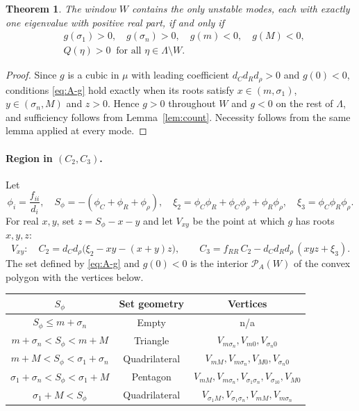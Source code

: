 \documentclass[11pt]{article}
\newtheorem{theorem}{Theorem}
\theoremstyle{definition}
\theoremstyle{remark}
\begin{document}
\begin{theorem}\label{thm:A}
The window $W$ contains the only unstable modes, each with exactly one eigenvalue with positive real part, if and only if
\begin{align}
&g(\sigma_1)>0,\quad g(\sigma_n)>0,\quad g(m)<0,\quad g(M)<0, \label{eq:A-g}\\
&Q(\eta)>0\ \text{ for all }\eta\in\Lambda\setminus W. \label{eq:A-Q}
\end{align}
\end{theorem}

\begin{proof}
Since $g$ is a cubic in $\mu$ with leading coefficient $d_Cd_Rd_\rho>0$ and $g(0)<0$, conditions \eqref{eq:A-g} hold exactly when its roots satisfy $x\in(m,\sigma_1)$, $y\in(\sigma_n,M)$ and $z>0$. Hence $g>0$ throughout $W$ and $g<0$ on the rest of $\Lambda$, and sufficiency follows from Lemma~\ref{lem:count}. Necessity follows from the same lemma applied at every mode.
\end{proof}

\paragraph{Region in $(C_2,C_3)$.} Let
\[
\phi_i=\frac{f_{ii}}{d_i},\quad S_\phi=-(\phi_C+\phi_R+\phi_\rho),\quad
\xi_2=\phi_C\phi_R+\phi_C\phi_\rho+\phi_R\phi_\rho,\quad \xi_3=\phi_C\phi_R\phi_\rho.
\]
For real $x,y$, set $z=S_\phi-x-y$ and let $V_{xy}$ be the point at which $g$ has roots $x,y,z$:
\[
V_{xy}:\quad
C_2=d_Cd_\rho\bigl(\xi_2-xy-(x+y)z\bigr),\qquad
C_3=f_{RR}\,C_2-d_Cd_Rd_\rho\,(xyz+\xi_3).
\]
The set defined by \eqref{eq:A-g} and $g(0)<0$ is the interior $\mathcal{P}_A(W)$ of the convex polygon with the vertices below.

\begin{center}
\renewcommand{\arraystretch}{1.25}
\begin{tabular}{|c|c|c|}
\hline
$S_\phi$ & Set geometry & Vertices \\
\hline
$S_\phi\le m+\sigma_n$ & Empty & n/a \\
\hline
$m+\sigma_n<S_\phi<m+M$ & Triangle & $V_{m\sigma_n},V_{m0},V_{\sigma_n0}$ \\
\hline
$m+M<S_\phi<\sigma_1+\sigma_n$ & Quadrilateral & $V_{mM},V_{m\sigma_n},V_{M0},V_{\sigma_n0}$ \\
\hline
$\sigma_1+\sigma_n<S_\phi<\sigma_1+M$ & Pentagon & $V_{mM},V_{m\sigma_n},V_{\sigma_1\sigma_n},V_{\sigma_10},V_{M0}$ \\
\hline
$\sigma_1+M<S_\phi$ & Quadrilateral & $V_{\sigma_1M},V_{\sigma_1\sigma_n},V_{mM},V_{m\sigma_n}$ \\
\hline
\end{tabular}
\end{center}
\end{document}
